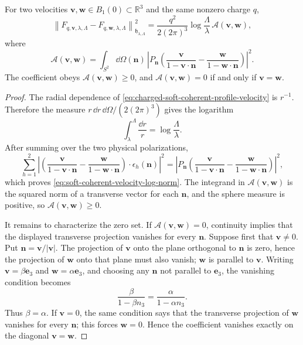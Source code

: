 \begin{proposition}
\label{prop:soft-coherent-velocity-separation}
For two velocities \(\mathbf v,\mathbf w\in B_1(0)\subset\mathbb R^3\) and the
same nonzero charge \(q\),
\begin{equation}
  \left\|
    F_{q,\mathbf v,\lambda,\Lambda}
    -
    F_{q,\mathbf w,\lambda,\Lambda}
  \right\|_{\mathfrak h_{\lambda,\Lambda}}^2
  =
  \frac{q^2}{2(2\pi)^3}
  \log\frac{\Lambda}{\lambda}\,
  \mathcal A(\mathbf v,\mathbf w),
  \label{eq:soft-coherent-velocity-log-norm}
\end{equation}
where
\begin{equation}
  \mathcal A(\mathbf v,\mathbf w)
  =
  \int_{S^2}\dd\Omega(\mathbf n)\,
  \left|
    P_{\mathbf n}
    \left(
      \frac{\mathbf v}{1-\mathbf v\cdot\mathbf n}
      -
      \frac{\mathbf w}{1-\mathbf w\cdot\mathbf n}
    \right)
  \right|^2 .
  \label{eq:soft-coherent-angular-coefficient}
\end{equation}
The coefficient obeys \(\mathcal A(\mathbf v,\mathbf w)\ge0\), and
\(\mathcal A(\mathbf v,\mathbf w)=0\) if and only if
\(\mathbf v=\mathbf w\).
\end{proposition}

\begin{proof}
The radial dependence of
\eqref{eq:charged-soft-coherent-profile-velocity} is \(r^{-1}\).  Therefore
the measure \(r\,\dd r\,\dd\Omega/(2(2\pi)^3)\) gives the logarithm
\[
  \int_\lambda^\Lambda \frac{\dd r}{r}=\log\frac{\Lambda}{\lambda}.
\]
After summing over the two physical polarizations,
\[
  \sum_{h=1}^2
  \left|
    \left(
      \frac{\mathbf v}{1-\mathbf v\cdot\mathbf n}
      -
      \frac{\mathbf w}{1-\mathbf w\cdot\mathbf n}
    \right)
    \cdot\epsilon_h(\mathbf n)
  \right|^2
  =
  \left|
    P_{\mathbf n}
    \left(
      \frac{\mathbf v}{1-\mathbf v\cdot\mathbf n}
      -
      \frac{\mathbf w}{1-\mathbf w\cdot\mathbf n}
    \right)
  \right|^2 ,
\]
which proves \eqref{eq:soft-coherent-velocity-log-norm}.  The integrand in
\(\mathcal A(\mathbf v,\mathbf w)\) is the squared norm of a transverse
vector for each \(\mathbf n\), and the sphere measure is positive, so
\(\mathcal A(\mathbf v,\mathbf w)\ge0\).

It remains to characterize the zero set.  If
\(\mathcal A(\mathbf v,\mathbf w)=0\), continuity implies that the displayed
transverse projection vanishes for every \(\mathbf n\).  Suppose first that
\(\mathbf v\ne0\).  Put
\(\mathbf n=\mathbf v/|\mathbf v|\).  The projection of \(\mathbf v\) onto
the plane orthogonal to \(\mathbf n\) is zero, hence the projection of
\(\mathbf w\) onto that plane must also vanish; \(\mathbf w\) is parallel to
\(\mathbf v\).  Writing
\(\mathbf v=\beta\mathbf e_3\) and
\(\mathbf w=\alpha\mathbf e_3\), and choosing any
\(\mathbf n\) not parallel to \(\mathbf e_3\), the vanishing condition becomes
\[
  \frac{\beta}{1-\beta n_3}
  =
  \frac{\alpha}{1-\alpha n_3}.
\]
Thus \(\beta=\alpha\).  If \(\mathbf v=0\), the same condition says that the
transverse projection of \(\mathbf w\) vanishes for every \(\mathbf n\); this
forces \(\mathbf w=0\).  Hence the coefficient vanishes exactly on the
diagonal \(\mathbf v=\mathbf w\).
\end{proof}

